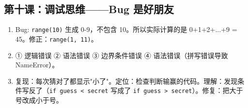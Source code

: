 \documentclass[a4paper,12pt]{ctexart}
\begin{document}
\subsection*{第十课：调试思维——Bug 是好朋友}
\begin{enumerate}
  \item Bug: \texttt{range(10)} 生成 0-9，不包含 10。所以实际计算的是 0+1+2+...+9 = 45。修正：\texttt{range(1, 11)}。
  \item ① 逻辑错误 ② 语法错误 ③ 边界条件错误 ④ 语法错误（拼写错误导致 NameError）。
  \item 复现：每次猜对了都显示"小了"。定位：检查判断输赢的代码。理解：发现条件写反了（\texttt{if guess < secret} 写成了 \texttt{if guess > secret}）。修复：把大于号改成小于号。
\end{enumerate}
\end{document}
